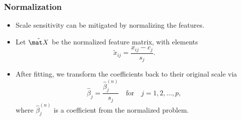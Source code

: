 \documentclass[aspectratio=1610,onlytextwidth]{beamer}
\begin{document}
\begin{frame}[c]
  \frametitle{Normalization}

  \begin{itemize}[<+->]
    \item Scale sensitivity can be mitigated by normalizing the features.
    \item Let \(\tilde{\mat X}\) be the normalized feature matrix, with elements
          \[
            \tilde{x}_{ij} = \frac{x_{ij} - c_{j}}{s_j}.
          \]
    \item After fitting, we transform the coefficients back to their original scale via
          \[
            \hat\beta_j = \frac{\hat\beta^{(n)}_j}{s_j} \quad\text{for}\quad j = 1,2,\dots,p,
          \]
          where \(\hat\beta^{(n)}_j\) is a coefficient from the normalized problem.
  \end{itemize}

\end{frame}
\end{document}

